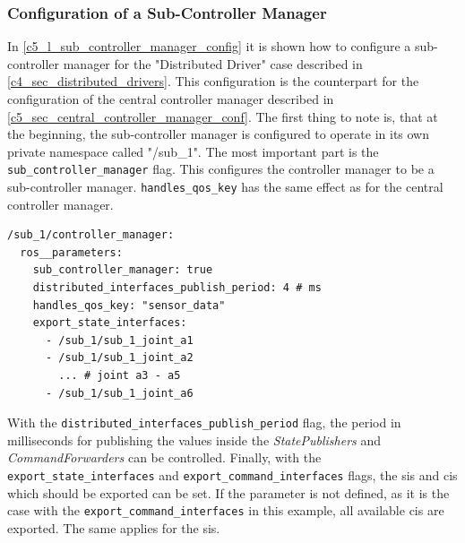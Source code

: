 \subsubsection{Configuration of a Sub-Controller Manager}\label{c5_sec_sub_controller_configuration}
In \autoref{c5_l_sub_controller_manager_config} it is shown how to configure a sub-controller manager for the "Distributed Driver" case described in \autoref{c4_sec_distributed_drivers}. This configuration is the counterpart for the configuration of the central controller manager described in \autoref{c5_sec_central_controller_manager_conf}.\newline
The first thing to note is, that at the beginning, the sub-controller manager is configured to operate in its own private namespace called "/sub\_1". The most important part is the \lstset{language=yaml,basicstyle=\small\ttfamily, breaklines=true}\lstinline{sub_controller_manager} flag. This configures the controller manager to be a sub-controller manager. \lstset{language=yaml,basicstyle=\small\ttfamily, breaklines=true}\lstinline{handles_qos_key} has the same effect as for the central controller manager.
\lstset{language=yaml,basicstyle=\small}
\begin{lstlisting}[caption=Example configuration of a sub-controller manager which exports all of it's command and state interfaces.,label=c5_l_sub_controller_manager_config]
/sub_1/controller_manager:
  ros__parameters:
    sub_controller_manager: true
    distributed_interfaces_publish_period: 4 # ms
    handles_qos_key: "sensor_data"
    export_state_interfaces:
      - /sub_1/sub_1_joint_a1
      - /sub_1/sub_1_joint_a2
        ... # joint a3 - a5
      - /sub_1/sub_1_joint_a6
\end{lstlisting}
With the \lstset{language=yaml,basicstyle=\small\ttfamily, breaklines=true}\lstinline{distributed_interfaces_publish_period} flag, the period in milliseconds for publishing the values inside the \textit{StatePublishers} and \textit{CommandForwarders} can be controlled. Finally, with the 
\lstset{language=yaml,basicstyle=\small\ttfamily, breaklines=true}\lstinline{export_state_interfaces} and \lstset{language=yaml,basicstyle=\small\ttfamily, breaklines=true}\lstinline{export_command_interfaces} flags, the \glspl{si} and \glspl{ci} which should be exported can be set. If the parameter is not defined, as it is the case with the \lstset{language=yaml,basicstyle=\small\ttfamily, breaklines=true}\lstinline{export_command_interfaces} in this example, all available \glspl{ci} are exported. The same applies for the \glspl{si}.

